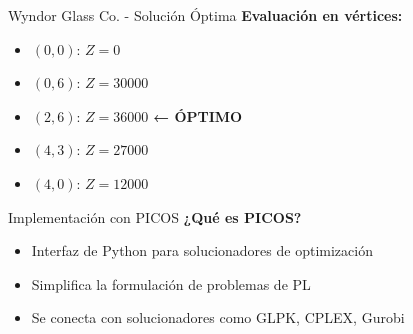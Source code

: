 \documentclass{beamer}
\begin{document}
\begin{frame}{Wyndor Glass Co. - Solución Óptima}
    \textbf{Evaluación en vértices:}
    \begin{itemize}
        \item<1-> $(0,0)$: $Z = 0$
        \item<2-> $(0,6)$: $Z = 30000$
        \item<3-> $(2,6)$: $Z = 36000$ \textcolor{accent}{\textbf{← ÓPTIMO}}
        \item<4-> $(4,3)$: $Z = 27000$
        \item<5-> $(4,0)$: $Z = 12000$
    \end{itemize}
    
    \vspace{1em}
\end{frame}

\begin{frame}{Implementación con PICOS}
    \textbf{¿Qué es PICOS?}
    \begin{itemize}
        \item Interfaz de Python para solucionadores de optimización
        \item Simplifica la formulación de problemas de PL
        \item Se conecta con solucionadores como GLPK, CPLEX, Gurobi
    \end{itemize}
    
    \vspace{1em}
\end{frame}
\end{document}
